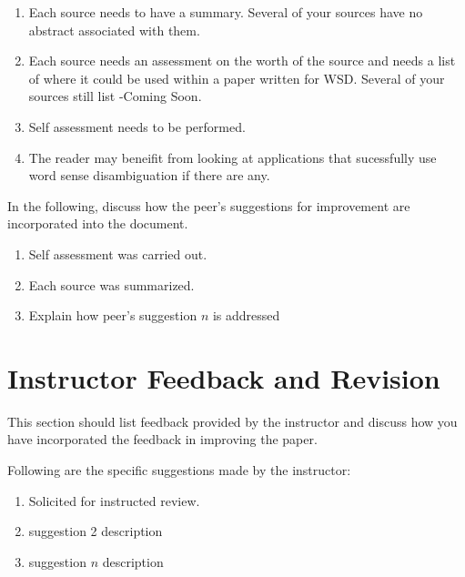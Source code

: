 \documentclass[11pt]{article}
\begin{document}
\begin{enumerate}

   \item Each source needs to have a summary. Several of your sources have no abstract associated with them.

   \item Each source needs an assessment on the worth of the source and needs a list of where it could be used within a paper written for WSD. Several of your sources still list -Coming Soon.

   \item Self assessment needs to be performed.
   \item The reader may beneifit from looking at applications that sucessfully use word sense disambiguation if there are any.

\end{enumerate}

In the following, discuss how the peer's suggestions for improvement are incorporated into the document.

\begin{enumerate}

   \item Self assessment was carried out.

   \item Each source was summarized. 

   \item Explain how peer's suggestion $n$ is addressed

\end{enumerate}


\section{Instructor Feedback and Revision} \label{sec:instructor}

This section should list feedback provided by the instructor and discuss how you have incorporated the feedback in improving the paper.


Following are the specific suggestions made by the instructor:

\begin{enumerate}

   \item Solicited for instructed review.

   \item suggestion 2 description

   \item suggestion $n$ description

\end{enumerate}
\end{document}
